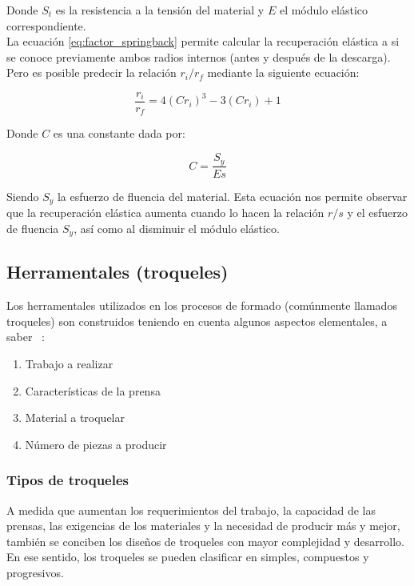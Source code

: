 Donde $S_t$ es la resistencia a la tensión del material y $E$ el módulo elástico correspondiente.\\

La ecuación \ref{eq:factor_springback} permite calcular la recuperación elástica a si se conoce 
previamente ambos radios internos (antes y después de la descarga). Pero es posible 
predecir la relación $r_i/r_f$ mediante la siguiente ecuación: ~\cite{kalpakjian2008}

\begin{equation}
\frac{r_i}{r_f} = 4 \left( C r_i\right)^3 - 3 \left( C r_i \right) + 1
\end{equation}

Donde $C$ es una constante dada por:

\begin{equation}
C = \frac{S_y}{Es}
\end{equation}

Siendo $S_y$ la esfuerzo de fluencia del material. Esta ecuación nos permite observar 
que la recuperación elástica aumenta cuando lo hacen la relación $r/s$ y el 
esfuerzo de fluencia $S_y$, así como al disminuir el módulo elástico.


\subsection{Herramentales (troqueles)}

Los herramentales utilizados en los procesos de formado (comúnmente llamados troqueles) son 
construidos teniendo en cuenta algunos aspectos elementales, a saber ~\cite{marin2009}:

\begin{enumerate}
\item Trabajo a realizar 
\item Características de la prensa
\item Material a troquelar
\item Número de piezas a producir
\end{enumerate}

\subsubsection{Tipos de troqueles}

A medida que aumentan los requerimientos del trabajo, la capacidad de las prensas, las exigencias 
de los materiales y la necesidad de producir más y mejor, también se conciben los diseños de 
troqueles con mayor complejidad y desarrollo. En ese sentido, los troqueles se pueden clasificar 
en simples, compuestos y progresivos.\\

